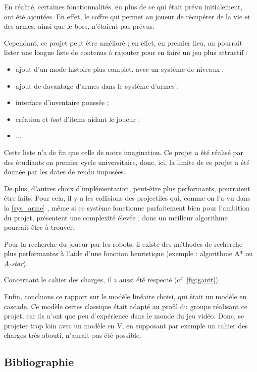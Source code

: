 \documentclass[a4paper,11pt]{article}
\newcommand{\secref}[1]{\autoref{#1} \og \nameref{#1} \fg{}}
\begin{document}
En réalité, certaines fonctionnalités, en plus de ce qui était prévu initialement, ont été ajoutées. En effet, le coffre qui permet au joueur de récupérer de la vie et des armes, ainsi que le boss, n'étaient pas prévus. 

Cependant, ce projet peut être amélioré ; en effet, en premier lieu, on pourrait lister une longue liste de contenus à rajouter pour en faire un jeu plus attractif :
\begin{itemize}
    \item ajout d'un mode histoire plus complet, avec un système de niveaux ;
    \item ajout de davantage d'armes dans le système d'armes ;
    \item interface d'inventaire poussée ;
    \item création et \emph{loot} d'items aidant le joueur ;
    \item ...
\end{itemize}
Cette liste n'a de fin que celle de notre imagination. Ce projet a été réalisé par des étudiants en premier cycle universitaire, donc, ici, la limite de ce projet a été donnée par les dates de rendu imposées.
 
De plus, d'autres choix d'implémentation, peut-être plus performants, pourraient être faits. Pour cela, il y a les collisions des projectiles qui, comme on l'a vu dans la \secref{sys_arme}, même si ce système fonctionne parfaitement bien pour l'ambition du projet, présentent une complexité élevée ; donc un meilleur algorithme pourrait être à trouver.

Pour la recherche du joueur par les robots, il existe des méthodes de recherche plus performantes à l'aide d'une fonction heuristique (exemple : algorithme A* ou \emph{A-star}).

Concernant le cahier des charges, il a aussi été respecté (cf. \autoref{fig:gantt}).

Enfin, concluons ce rapport sur le modèle linéaire choisi, qui était un modèle en cascade. Ce modèle certes classique était adapté au profil du groupe réalisant ce projet, car ils n'ont que peu d'expérience dans le monde du jeu vidéo. Donc, se projeter trop loin avec un modèle en V, en supposant par exemple un cahier des charges très abouti, n'aurait pas été possible.

\newpage
\subsection{Bibliographie}
\end{document}
